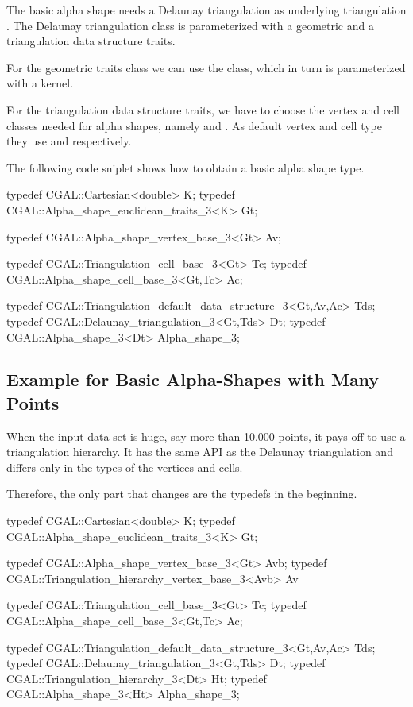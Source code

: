 The basic alpha shape needs a Delaunay triangulation as
underlying triangulation .  The Delaunay triangulation class is
parameterized with a geometric and a triangulation data structure traits.

For the geometric traits class we can use the 
class, which in turn is parameterized with a kernel.

For the triangulation data structure traits, we have to
choose the vertex and cell classes needed for alpha shapes,
namely  and .
As default vertex and cell type they use 
and   respectively. 



The following code sniplet shows how to obtain a basic
alpha shape type.

\begin{cprog}
typedef CGAL::Cartesian<double> K;
typedef CGAL::Alpha_shape_euclidean_traits_3<K> Gt;

typedef CGAL::Alpha_shape_vertex_base_3<Gt> Av;

typedef CGAL::Triangulation_cell_base_3<Gt> Tc;
typedef CGAL::Alpha_shape_cell_base_3<Gt,Tc> Ac;

typedef CGAL::Triangulation_default_data_structure_3<Gt,Av,Ac> Tds;
typedef CGAL::Delaunay_triangulation_3<Gt,Tds> Dt;
typedef CGAL::Alpha_shape_3<Dt> Alpha_shape_3;
\end{cprog}


\subsection{Example for Basic Alpha-Shapes with Many Points
         \label{I1_SectClassicAS3DHier}}

When the input data set is huge, say more than 10.000 points, it pays
off to use a triangulation hierarchy. It has the same API as the
Delaunay triangulation and differs only in the types of the vertices
and cells.

Therefore, the only part that changes are the typedefs in the beginning.

\begin{cprog}
typedef CGAL::Cartesian<double> K;
typedef CGAL::Alpha_shape_euclidean_traits_3<K> Gt;

typedef CGAL::Alpha_shape_vertex_base_3<Gt> Avb;
typedef CGAL::Triangulation_hierarchy_vertex_base_3<Avb> Av 

typedef CGAL::Triangulation_cell_base_3<Gt> Tc;
typedef CGAL::Alpha_shape_cell_base_3<Gt,Tc> Ac;

typedef CGAL::Triangulation_default_data_structure_3<Gt,Av,Ac> Tds;
typedef CGAL::Delaunay_triangulation_3<Gt,Tds> Dt;
typedef CGAL::Triangulation_hierarchy_3<Dt> Ht;
typedef CGAL::Alpha_shape_3<Ht> Alpha_shape_3;
\end{cprog}


